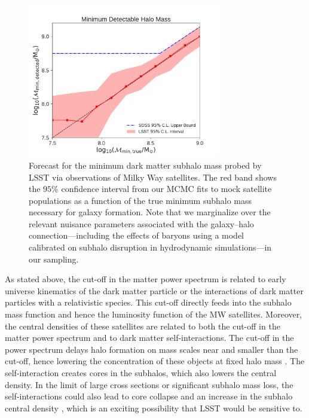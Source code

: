 \begin{figure}
\centering
\includegraphics[width=0.75\textwidth]{figures/LSST_Mmin.pdf}
\caption{Forecast for the minimum dark matter subhalo mass probed by LSST via observations of Milky Way satellites. The red band shows the $95\%$ confidence interval from our MCMC fits to mock satellite populations as a function of the true minimum subhalo mass necessary for galaxy formation. Note that we marginalize over the relevant nuisance parameters associated with the galaxy--halo connection---including the effects of baryons using a model calibrated on subhalo disruption in hydrodynamic simulations---in our sampling.}\label{fig:satellite_mmin}
\end{figure}

\vspace{1em} 


As stated above, the cut-off in the matter power spectrum is related to early universe kinematics of the dark matter particle or the interactions of dark matter particles with a relativistic species. This cut-off directly feeds into the subhalo mass function and hence the luminosity function of the MW satellites. Moreover, the central densities of these satellites are related to both the cut-off in the matter power spectrum and to dark matter self-interactions. The cut-off in the power spectrum delays halo formation on mass scales near and smaller than the cut-off, hence lowering the concentration of these objects at fixed halo mass \citep[see e.g.][]{Dunstan:2011bq}. The self-interaction creates cores in the subhalos, which also lowers the central density. In the limit of large cross sections or significant subhalo mass loss, the self-interactions could also lead to core collapse and an increase in the subhalo central density \citep{Balberg:2002ue,Ahn:2004xt,Nishikawa:2019lsc}, which is an exciting possibility that LSST would be sensitive to.

